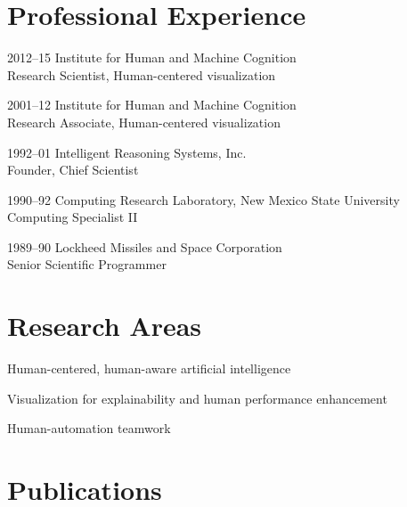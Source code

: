 \documentclass[12pt,letterpaper]{report}
\newcommand{\listitemspace}{0.25em}
\renewenvironment{itemize}
{\begin{list}{}{\setlength{\leftmargin}{0em}
                \setlength{\parskip}{0em}
                \setlength{\itemsep}{\listitemspace}
                \setlength{\parsep}{\listitemspace}}}
{\end{list}}
\begin{document}
    \section*{Professional Experience}

    \begin{tablist}

        \item[2012--15]   \tab{}Institute for Human and Machine Cognition\\
                              Research Scientist, Human-centered visualization

        \item[2001--12]   \tab{}Institute for Human and Machine Cognition\\
                              Research Associate, Human-centered visualization
                              
        \item[1992--01]\tab{}Intelligent Reasoning Systems, Inc.\\
                              Founder, Chief Scientist
 
         \item[1990--92]\tab{}Computing Research Laboratory, New Mexico State University\\
                              Computing Specialist II
                              
        \item[1989--90]\tab{}Lockheed Missiles and Space Corporation\\
                              Senior Scientific Programmer
    \end{tablist}

    \section*{Research Areas}

    \begin{itemize}

        \item Human-centered, human-aware artificial intelligence
        \item Visualization for explainability and human performance enhancement
        \item Human-automation teamwork

    \end{itemize}



    \section*{Publications}
\end{document}
